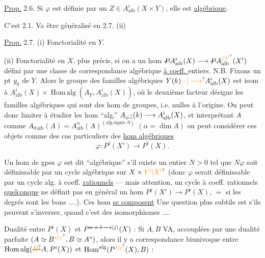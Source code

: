 \uline{Prop.} 2.6. Si $\varphi$ est définie par un $Z\in A^i_{\mathrm{alb}}(X\times Y)$,
elle est \uline{algébrique}.

C'est 2.1. Va être généralisé en 2.7. (ii)

\uline{Prop.} 2.7. 
(i) Fonctorialité en $Y$. 

(ii) Fonctorialité en $X$, plus précis, si on a
un hom $\deleted{P}A^i_{\mathrm{alb}}(X)\longrightarrow\deleted{P}A^{\unsure{j|i'}}_{\mathrm{alb}}(X')$ défini par
une classe de correspondance algébrique \uline{à coeff.
} entiers.
N.B. Fixons un pt $y_0$ de $Y$. Alors le groupe
des familles algébriques $Y(k)\unsure{-|\longrightarrow}A^i_{\mathrm{alb}}(X)$ est
isom à $A^i_{\mathrm{alb}}(X)\times\operatorname{Hom\,alg}(A_Y,A^i_{\mathrm{alb}}(X))$, où le
deuxième facteur désigne les familles algébriques
qui sont des hom de groupes, i.e. nulles à
l'origine. On peut donc  limiter à étudier
les hom ``alg.'' $A_{\deleted{\unsure{Y}}}(k)\longrightarrow A^i_{\mathrm{alb}}(X)$,  et interprétant
$A$ comme $A_{0\,\mathrm{alb}}(A)=A^\alpha_{\mathrm{alb}}(A)^{(\text{alg.équiv.}\,0)}$ $(\alpha=\dim A)$
on peut considérer  ces objets comme des
cas particuliers des \uline{hom algébriques}
\[
\varphi:P^j(X')\longrightarrow P^i(X).
\]

Un hom de gpes $\varphi$ est dit ``algébrique''
s'il existe un entier $N>0$ tel que
$N\varphi$ soit définissable par un cycle algébrique sur $X\times\unsure{Y'|X'}$
(donc $\varphi$ serait définissable par un cycle alg.
à coeff. \uline{rationnels} --- mais attention, un cycle
à coeff. rationnels \uline{quelconque} ne définit pas en
général un hom $P^j(X')\longrightarrow P^i(X)$, $=$ si les
degrés sont les bons ....). Ces hom \uline{se composent}
Une question plus subtile est s'ils peuvent
s'inverser, quand c'est des isomorphismes ....

Dualité entre $P^i(X)$ et $P^{\deleted{n+1-i}\inserted{j}}(X)$  : Si $A,B$
  VA,  accouplées
par une dualité parfaite $(A\simeq B^{\unsure{*|\vee}}, B\simeq A^*)$,
alors il y a correspondance biunivoque
entre $\operatorname{Hom\,alg}(\deleted{\unsure{B}}A,P^i(X))$ et $\operatorname{Hom}^{\mathrm{alg}}(P^{\unsure{1|j}}(X),B)$ :

